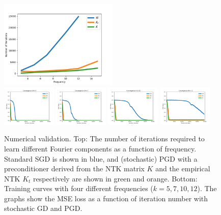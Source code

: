 \documentclass[10pt]{article} %
\theoremstyle{plain}
\theoremstyle{definition}
\theoremstyle{remark}
\begin{document}
\begin{figure}[tb]
    \centering
    \includegraphics[width=0.50\textwidth]{figures/bsize256.png}\\
    \includegraphics[width=0.23\textwidth]{figures/k5bsize256.png}
    \includegraphics[width=0.23\textwidth]{figures/k7bsize256.png}
    \includegraphics[width=0.23\textwidth]{figures/k10bsize256.png}
    \includegraphics[width=0.23\textwidth]{figures/k12bsize256.png}
    \caption{\small Numerical validation. Top: The number of iterations required to learn different Fourier components as a function of frequency. Standard SGD is shown in blue, and (stochastic) PGD with a preconditioner derived from the NTK matrix $K$ and the empirical NTK $K_t$ respectively are shown in green and orange. Bottom: Training curves with four different frequencies ($k=5,7,10,12$). The graphs show the MSE loss as a function of iteration number with stochastic GD and PGD.}
    \label{fig:numeric}
\end{figure}
\end{document}
